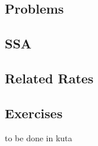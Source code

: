 \newpage
{}
\subsection{Problems}
\noindent{}
\newpage
\subsection{SSA}
\subsection{Related Rates}
\subsection{Exercises}
to be done in kuta


\newpage
{}
